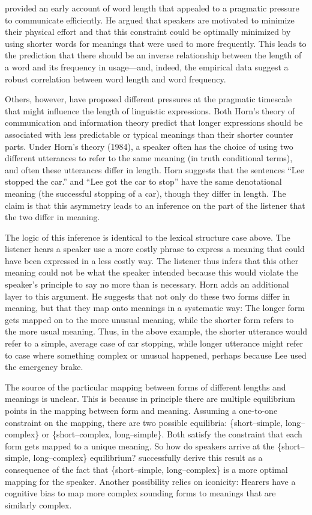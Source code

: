 \documentclass[man]{apa2}
\begin{document}
 provided an early account of word length that appealed to a pragmatic pressure to communicate efficiently. He argued that speakers are motivated to minimize their physical effort and that this constraint could be optimally minimized by using shorter words for meanings that were used to more frequently. This leads to the prediction that there should be an inverse relationship between the length of a word and its frequency in usage---and, indeed, the empirical data suggest a robust correlation between word length and word frequency.

Others, however, have proposed different pressures at the pragmatic timescale that might influence the length of linguistic expressions. Both Horn's theory of communication and information theory predict that longer expressions should be associated with less predictable or typical meanings than their shorter counter parts. Under Horn's theory (1984), a speaker often has the choice of using two different utterances to refer to the same meaning (in truth conditional terms), and often these utterances differ in length. Horn suggests that the sentences ``Lee stopped the car.'' and ``Lee got the car to stop'' have the same denotational meaning (the successful stopping of a car), though they differ in length. The claim is that this asymmetry leads to an inference on the part of the listener that the two differ in meaning.

The logic of this inference is identical to the lexical structure case above. The listener hears a speaker use a more costly phrase to express a meaning that could have been expressed in a less costly way. The listener thus infers that this other meaning could not be what the speaker intended because this would violate the speaker's principle to say no more than is necessary. Horn adds an additional layer to this argument. He suggests that not only do these two forms differ in meaning, but that they map onto meanings in a systematic way: The longer form gets mapped on to the more unusual meaning, while the shorter form refers to the more usual meaning. Thus, in the above example, the shorter utterance would refer to a simple, average case of car stopping, while longer utterance might refer to case where something complex or unusual happened, perhaps because Lee used the emergency brake.

The source of the particular mapping between forms of different lengths and meanings is unclear. This is because in principle there are multiple equilibrium points in the mapping between form and meaning. Assuming a one-to-one constraint on the mapping, there are two possible equilibria: \{short--simple, long--complex\} or \{short--complex, long--simple\}. Both satisfy the constraint that each form gets mapped to a unique meaning. So how do speakers arrive at the \{short--simple, long--complex\} equilibrium?  successfully derive this result as a consequence of the fact that \{short--simple, long--complex\} is a more optimal mapping for the speaker. Another possibility relies on iconicity: Hearers have a cognitive bias to map more complex sounding forms to meanings that are similarly complex.
\end{document}
